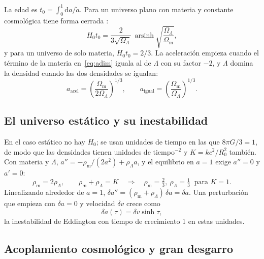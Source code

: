 \documentclass[11pt,a4paper]{article}
\begin{document}
La edad es $t_0 = \int_0^1 \mathrm{d}a/\dot a$. Para un universo plano con materia y constante cosmológica tiene forma cerrada \parencite{ryden2003}:
\begin{equation}\label{eq:edad}
H_0 t_0 = \frac{2}{3\sqrt{\Omega_\Lambda}}\, \operatorname{arsinh}\sqrt{\frac{\Omega_\Lambda}{\Omega_{\mathrm m}}},
\end{equation}
y para un universo de solo materia, $H_0 t_0 = 2/3$. La aceleración empieza cuando el término de la materia en~\eqref{eq:adim} iguala al de $\Lambda$ con su factor $-2$, y $\Lambda$ domina la densidad cuando las dos densidades se igualan:
\begin{equation}\label{eq:transiciones}
a_{\mathrm{acel}} = \left(\frac{\Omega_{\mathrm m}}{2\Omega_\Lambda}\right)^{1/3}, \qquad a_{\mathrm{igual}} = \left(\frac{\Omega_{\mathrm m}}{\Omega_\Lambda}\right)^{1/3}.
\end{equation}

\subsection{El universo estático y su inestabilidad}

En el caso estático no hay $H_0$; se usan unidades de tiempo en las que $8\pi G/3 = 1$, de modo que las densidades tienen unidades de tiempo$^{-2}$ y $K = kc^2/R_0^2$ también. Con materia y $\Lambda$, $a'' = -\rho_{\mathrm m}/(2a^2) + \rho_\Lambda a$, y el equilibrio en $a = 1$ exige $a'' = 0$ y $a' = 0$:
\begin{equation}\label{eq:einstein}
\rho_{\mathrm m} = 2\rho_\Lambda, \qquad \rho_{\mathrm m} + \rho_\Lambda = K \quad\Rightarrow\quad \rho_{\mathrm m} = \tfrac23,\ \rho_\Lambda = \tfrac13 \ \text{ para } K = 1.
\end{equation}
Linealizando alrededor de $a = 1$, $\delta a'' = (\rho_{\mathrm m} + \rho_\Lambda)\,\delta a = \delta a$. Una perturbación que empieza con $\delta a = 0$ y velocidad $\delta v$ crece como
\begin{equation}\label{eq:eddington}
\delta a(\tau) = \delta v \sinh\tau ,
\end{equation}
la inestabilidad de Eddington con tiempo de crecimiento 1 en estas unidades.

\subsection{Acoplamiento cosmológico y gran desgarro}
\end{document}
